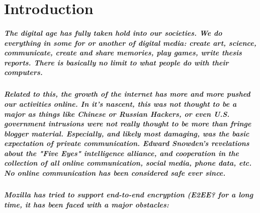 




\chapter{Introduction}
\paragraph{The digital age has fully taken hold into our societies. We do everything in some for or another of digital media: create art, science, communicate, create and share memories, play games, write thesis reports. There is basically no limit to what people do with their computers.}
\paragraph{Related to this, the growth of the internet has more and more pushed our activities online. In it's nascent, this was not thought to be a major as things like Chinese or Russian Hackers, or even U.S. government intrusions were not really thought to be more than fringe blogger material. Especially, and likely most damaging, was the basic expectation of private communication. Edward Snowden's revelations about the "Five Eyes" intelligence alliance, and cooperation in the collection of all online communication, social media, phone data, etc. No online communication has been considered safe ever since.}


\paragraph{Mozilla has tried to support end-to-end encryption (E2EE? for a long time, it has been faced with a major obstacles:}

